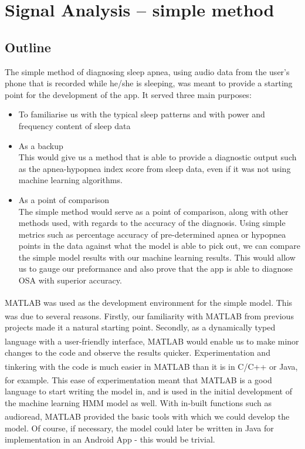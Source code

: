 \section{Signal Analysis -- simple method}

\subsection{Outline}

The simple method of diagnosing sleep apnea, using audio data from the user's phone that is recorded while he/she is sleeping, was meant to provide a starting point for the development of the app. It served three main purposes:

\begin{itemize}
\item To familiarise us with the typical sleep patterns and with power and frequency content of sleep data
\item As a backup\\
This would give us a method that is able to provide a diagnostic output such as the apnea-hypopnea index score from sleep data, even if it was not using machine learning algorithms. 
\item As a point of comparison\\
The simple method would serve as a point of comparison, along with other methods used, with regards to the accuracy of the diagnosis. Using simple metrics such as percentage accuracy of pre-determined apnea or hypopnea points in the data against what the model is able to pick out, we can compare the simple model results with our machine learning results. This would allow us to gauge our preformance and also prove that the app is able to diagnose OSA with superior accuracy.
\end{itemize}

MATLAB\textsuperscript{\textregistered{}} was used as the development environment for the simple model. This was due to several reasons. Firstly, our familiarity with MATLAB\textsuperscript{\textregistered{}} from previous projects made it a natural starting point. Secondly, as a dynamically typed language with a user-friendly interface, MATLAB\textsuperscript{\textregistered{}} would enable us to make minor changes to the code and observe the results quicker. Experimentation and tinkering with the code is much easier in MATLAB\textsuperscript{\textregistered{}}  than it is in C/C++ or Java, for example. This ease of experimentation meant that MATLAB\textsuperscript{\textregistered{}} is a good language to start writing the model in, and is used in the initial development of the machine learning HMM model as well. With in-built functions such as audioread, MATLAB\textsuperscript{\textregistered{}}  provided the basic tools with which we could develop the model. Of course, if necessary, the model could later be written in Java for implementation in an Android App - this would be trivial.

